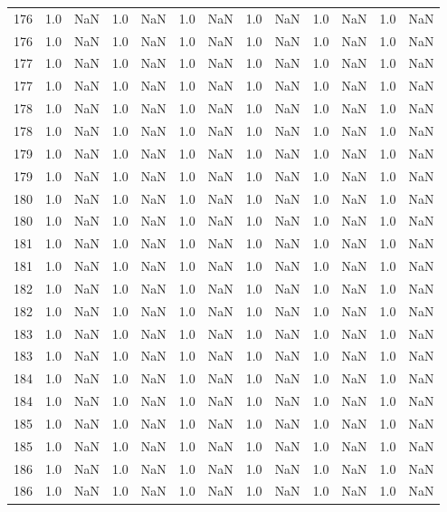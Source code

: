 \begin{tabular}{lrrrrrrrrrrrr}
176 & 1.0 & NaN & 1.0 & NaN & 1.0 & NaN & 1.0 & NaN & 1.0 & NaN & 1.0 & NaN \\
176 & 1.0 & NaN & 1.0 & NaN & 1.0 & NaN & 1.0 & NaN & 1.0 & NaN & 1.0 & NaN \\
177 & 1.0 & NaN & 1.0 & NaN & 1.0 & NaN & 1.0 & NaN & 1.0 & NaN & 1.0 & NaN \\
177 & 1.0 & NaN & 1.0 & NaN & 1.0 & NaN & 1.0 & NaN & 1.0 & NaN & 1.0 & NaN \\
178 & 1.0 & NaN & 1.0 & NaN & 1.0 & NaN & 1.0 & NaN & 1.0 & NaN & 1.0 & NaN \\
178 & 1.0 & NaN & 1.0 & NaN & 1.0 & NaN & 1.0 & NaN & 1.0 & NaN & 1.0 & NaN \\
179 & 1.0 & NaN & 1.0 & NaN & 1.0 & NaN & 1.0 & NaN & 1.0 & NaN & 1.0 & NaN \\
179 & 1.0 & NaN & 1.0 & NaN & 1.0 & NaN & 1.0 & NaN & 1.0 & NaN & 1.0 & NaN \\
180 & 1.0 & NaN & 1.0 & NaN & 1.0 & NaN & 1.0 & NaN & 1.0 & NaN & 1.0 & NaN \\
180 & 1.0 & NaN & 1.0 & NaN & 1.0 & NaN & 1.0 & NaN & 1.0 & NaN & 1.0 & NaN \\
181 & 1.0 & NaN & 1.0 & NaN & 1.0 & NaN & 1.0 & NaN & 1.0 & NaN & 1.0 & NaN \\
181 & 1.0 & NaN & 1.0 & NaN & 1.0 & NaN & 1.0 & NaN & 1.0 & NaN & 1.0 & NaN \\
182 & 1.0 & NaN & 1.0 & NaN & 1.0 & NaN & 1.0 & NaN & 1.0 & NaN & 1.0 & NaN \\
182 & 1.0 & NaN & 1.0 & NaN & 1.0 & NaN & 1.0 & NaN & 1.0 & NaN & 1.0 & NaN \\
183 & 1.0 & NaN & 1.0 & NaN & 1.0 & NaN & 1.0 & NaN & 1.0 & NaN & 1.0 & NaN \\
183 & 1.0 & NaN & 1.0 & NaN & 1.0 & NaN & 1.0 & NaN & 1.0 & NaN & 1.0 & NaN \\
184 & 1.0 & NaN & 1.0 & NaN & 1.0 & NaN & 1.0 & NaN & 1.0 & NaN & 1.0 & NaN \\
184 & 1.0 & NaN & 1.0 & NaN & 1.0 & NaN & 1.0 & NaN & 1.0 & NaN & 1.0 & NaN \\
185 & 1.0 & NaN & 1.0 & NaN & 1.0 & NaN & 1.0 & NaN & 1.0 & NaN & 1.0 & NaN \\
185 & 1.0 & NaN & 1.0 & NaN & 1.0 & NaN & 1.0 & NaN & 1.0 & NaN & 1.0 & NaN \\
186 & 1.0 & NaN & 1.0 & NaN & 1.0 & NaN & 1.0 & NaN & 1.0 & NaN & 1.0 & NaN \\
186 & 1.0 & NaN & 1.0 & NaN & 1.0 & NaN & 1.0 & NaN & 1.0 & NaN & 1.0 & NaN \\

\end{tabular}
